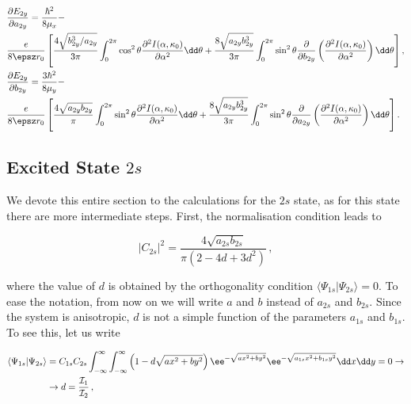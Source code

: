 \begin{subequations}
    \begin{align}
        &\frac{\partial E_{2y}}{\partial a_{2y}} = \frac{\hbar^{2}}{8\mu_{x}} - \\
        &\frac{e}{8 \epsz r_{0}}  \left[ \frac{4 \sqrt{b_{2y}^3/a_{2y}}}{3 \pi} \int_{0}^{2\pi} \cos^2 \theta \frac{\partial^2 I (\alpha, \kappa_0)}{\partial \alpha^2}  \dd\theta + \frac{8 \sqrt{a_{2y} b_{2y}^3}}{3 \pi} \int_{0}^{2\pi} \sin^2 \theta \frac{\partial }{\partial b_{2y}} \left(\frac{\partial^2 I (\alpha, \kappa_0)}{\partial \alpha^2}  \right)\dd\theta \right] ,  \notag\\
        &\frac{\partial E_{2y}}{\partial b_{2y}} = \frac{3 \hbar^{2}}{8\mu_{y}} - \\
        &\frac{e}{8 \epsz r_{0}}\left[ \frac{4 \sqrt{a_{2y} b_{2y}}}{\pi} \int_{0}^{2\pi} \sin^2 \theta \frac{\partial^2 I (\alpha, \kappa_0)}{\partial \alpha^2}  \dd\theta + \frac{8 \sqrt{a_{2y} b_{2y}^3}}{3 \pi}  \int_{0}^{2\pi} \sin^2 \theta \frac{\partial }{\partial a_{2y}} \left(\frac{\partial^2 I (\alpha, \kappa_0)}{\partial \alpha^2}  \right)\dd\theta \right] .\notag
    \end{align}
\end{subequations}

\subsection{Excited State $2s$}
\label{subsec:excited_state_2s}

We devote this entire section to the calculations for the $2s$ state, as for this state there are more intermediate steps.
First, the normalisation condition leads to

\begin{equation}
    |C_{2s}|^2 = \frac{4 \sqrt{a_{2s} b_{2s}}}{\pi (2 - 4d + 3 d^2)}\,,
\end{equation}

\noindent where the value of $d$ is obtained by the orthogonality condition $\langle \Psi_{1s} | \Psi_{2s} \rangle = 0$.
To ease the notation, from now on we will write $a$ and $b$ instead of $a_{2s}$ and $b_{2s}$.
Since the system is anisotropic, $d$ is not a simple function of the parameters $a_{1s}$ and $b_{1s}$.
To see this, let us write

\begin{align}
    \langle \Psi_{1s} | \Psi_{2s} \rangle &= C_{1s} C_{2s} \int_{-\infty}^{\infty} \int_{-\infty}^{\infty}\left(1-d\sqrt{ax^{2}+by^{2}}\right) \ee^{-\sqrt{ax^{2}+by^{2}}} \ee^{-\sqrt{a_{1s}x^{2}+b_{1s}y^{2}}} \dd x \dd y = 0 \rightarrow \notag \\
    &\rightarrow d = \frac{\mathcal{I}_1}{\mathcal{I}_2} \,,
\end{align}

